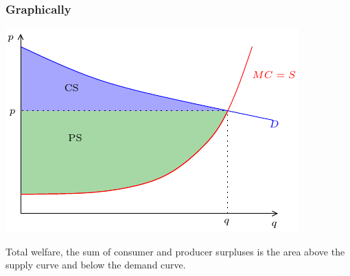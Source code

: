 \documentclass[xcolor=pdftex,dvipsnames]{beamer}
\begin{document}
\begin{frame}
\frametitle{Graphically}
\begin{center}
\includegraphics{pics/W}
\end{center}
Total welfare, the sum of consumer and producer surpluses is the area
above the supply curve and below the demand curve.
\end{frame}
\end{document}
